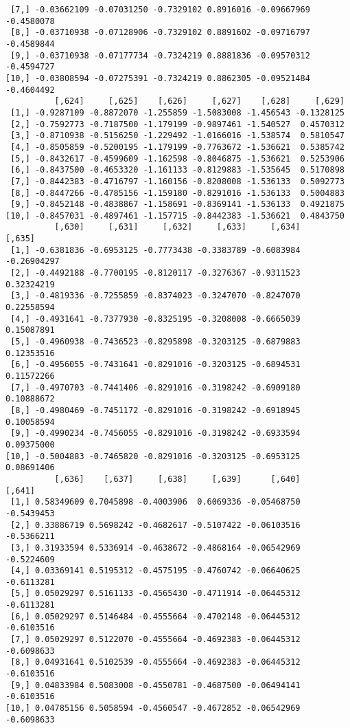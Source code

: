 \documentclass[
  letterpaper,
  DIV=11,
  numbers=noendperiod]{scrreprt}
\begin{document}
\begin{verbatim}
 [7,] -0.03662109 -0.07031250 -0.7329102 0.8916016 -0.09667969 -0.4580078
 [8,] -0.03710938 -0.07128906 -0.7329102 0.8891602 -0.09716797 -0.4589844
 [9,] -0.03710938 -0.07177734 -0.7324219 0.8881836 -0.09570312 -0.4594727
[10,] -0.03808594 -0.07275391 -0.7324219 0.8862305 -0.09521484 -0.4604492
          [,624]     [,625]    [,626]     [,627]    [,628]     [,629]
 [1,] -0.9287109 -0.8872070 -1.255859 -1.5083008 -1.456543 -0.1328125
 [2,] -0.7592773 -0.7187500 -1.179199 -0.9897461 -1.540527  0.4570312
 [3,] -0.8710938 -0.5156250 -1.229492 -1.0166016 -1.538574  0.5810547
 [4,] -0.8505859 -0.5200195 -1.179199 -0.7763672 -1.536621  0.5385742
 [5,] -0.8432617 -0.4599609 -1.162598 -0.8046875 -1.536621  0.5253906
 [6,] -0.8437500 -0.4653320 -1.161133 -0.8129883 -1.535645  0.5170898
 [7,] -0.8442383 -0.4716797 -1.160156 -0.8208008 -1.536133  0.5092773
 [8,] -0.8447266 -0.4785156 -1.159180 -0.8291016 -1.536133  0.5004883
 [9,] -0.8452148 -0.4838867 -1.158691 -0.8369141 -1.536133  0.4921875
[10,] -0.8457031 -0.4897461 -1.157715 -0.8442383 -1.536621  0.4843750
          [,630]     [,631]     [,632]     [,633]     [,634]      [,635]
 [1,] -0.6381836 -0.6953125 -0.7773438 -0.3383789 -0.6083984 -0.26904297
 [2,] -0.4492188 -0.7700195 -0.8120117 -0.3276367 -0.9311523  0.32324219
 [3,] -0.4819336 -0.7255859 -0.8374023 -0.3247070 -0.8247070  0.22558594
 [4,] -0.4931641 -0.7377930 -0.8325195 -0.3208008 -0.6665039  0.15087891
 [5,] -0.4960938 -0.7436523 -0.8295898 -0.3203125 -0.6879883  0.12353516
 [6,] -0.4956055 -0.7431641 -0.8291016 -0.3203125 -0.6894531  0.11572266
 [7,] -0.4970703 -0.7441406 -0.8291016 -0.3198242 -0.6909180  0.10888672
 [8,] -0.4980469 -0.7451172 -0.8291016 -0.3198242 -0.6918945  0.10058594
 [9,] -0.4990234 -0.7456055 -0.8291016 -0.3198242 -0.6933594  0.09375000
[10,] -0.5004883 -0.7465820 -0.8291016 -0.3203125 -0.6953125  0.08691406
          [,636]    [,637]     [,638]     [,639]      [,640]     [,641]
 [1,] 0.58349609 0.7045898 -0.4003906  0.6069336 -0.05468750 -0.5439453
 [2,] 0.33886719 0.5698242 -0.4682617 -0.5107422 -0.06103516 -0.5366211
 [3,] 0.31933594 0.5336914 -0.4638672 -0.4868164 -0.06542969 -0.5224609
 [4,] 0.03369141 0.5195312 -0.4575195 -0.4760742 -0.06640625 -0.6113281
 [5,] 0.05029297 0.5161133 -0.4565430 -0.4711914 -0.06445312 -0.6113281
 [6,] 0.05029297 0.5146484 -0.4555664 -0.4702148 -0.06445312 -0.6103516
 [7,] 0.05029297 0.5122070 -0.4555664 -0.4692383 -0.06445312 -0.6098633
 [8,] 0.04931641 0.5102539 -0.4555664 -0.4692383 -0.06445312 -0.6103516
 [9,] 0.04833984 0.5083008 -0.4550781 -0.4687500 -0.06494141 -0.6103516
[10,] 0.04785156 0.5058594 -0.4560547 -0.4672852 -0.06542969 -0.6098633

\end{verbatim}
\end{document}
